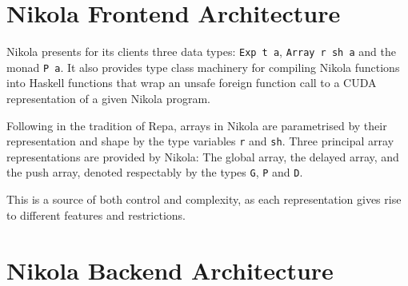 \section{Nikola Frontend Architecture}


Nikola presents for its clients three data types: \texttt{Exp t a},
\texttt{Array r sh a} and the monad \texttt{P a}. It also provides type class
machinery for compiling Nikola functions into Haskell functions that wrap an
unsafe foreign function call to a CUDA representation of a given Nikola
program.

Following in the tradition of Repa, arrays in Nikola are parametrised by their
representation and shape by the type variables \texttt{r} and \texttt{sh}.
Three principal array representations are provided by Nikola: The global array,
the delayed array, and the push array, denoted respectably by the types
\texttt{G}, \texttt{P} and \texttt{D}.

This is a source of both control and complexity, as each representation gives
rise to different features and restrictions.

\section{Nikola Backend Architecture}

